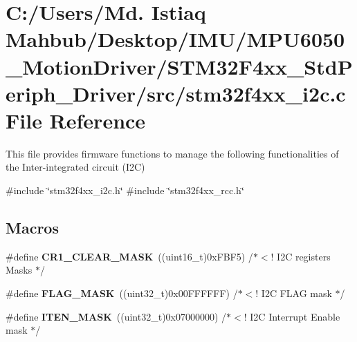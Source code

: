 \section{C\+:/\+Users/\+Md. Istiaq Mahbub/\+Desktop/\+I\+M\+U/\+M\+P\+U6050\+\_\+\+Motion\+Driver/\+S\+T\+M32\+F4xx\+\_\+\+Std\+Periph\+\_\+\+Driver/src/stm32f4xx\+\_\+i2c.c File Reference}
\label{stm32f4xx__i2c_8c}


This file provides firmware functions to manage the following functionalities of the Inter-\/integrated circuit (I2C)  


{\ttfamily \#include \char`\"{}stm32f4xx\+\_\+i2c.\+h\char`\"{}}\newline
{\ttfamily \#include \char`\"{}stm32f4xx\+\_\+rcc.\+h\char`\"{}}\newline
\subsection*{Macros}
\begin{DoxyCompactItemize}
\item 
\#define \textbf{ C\+R1\+\_\+\+C\+L\+E\+A\+R\+\_\+\+M\+A\+SK}~((uint16\+\_\+t)0x\+F\+B\+F5)      /$\ast$$<$! I2\+C registers Masks $\ast$/
\item 
\#define \textbf{ F\+L\+A\+G\+\_\+\+M\+A\+SK}~((uint32\+\_\+t)0x00\+F\+F\+F\+F\+F\+F)  /$\ast$$<$! I2\+C F\+L\+A\+G mask $\ast$/
\item 
\#define \textbf{ I\+T\+E\+N\+\_\+\+M\+A\+SK}~((uint32\+\_\+t)0x07000000)  /$\ast$$<$! I2\+C Interrupt Enable mask $\ast$/
\end{DoxyCompactItemize}
